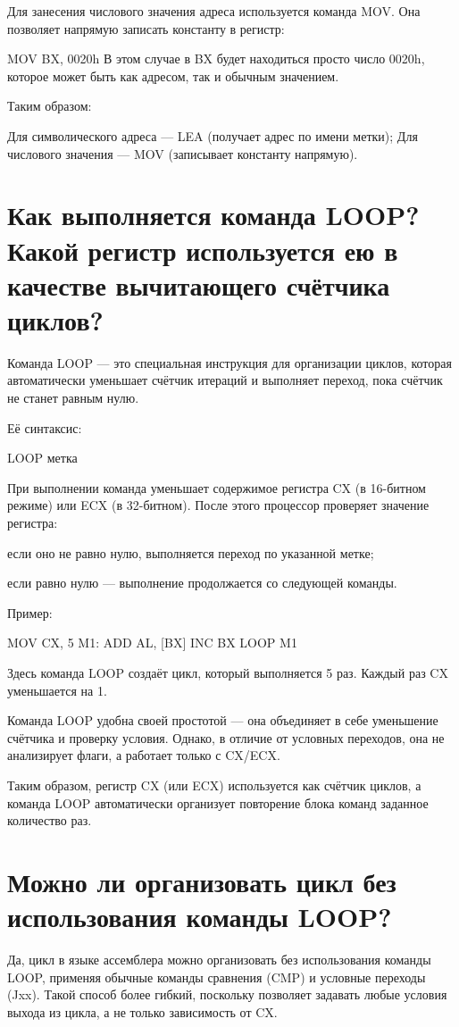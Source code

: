 Для занесения числового значения адреса используется команда MOV. Она позволяет напрямую записать константу в регистр:

MOV BX, 0020h
В этом случае в BX будет находиться просто число 0020h, которое может быть как адресом, так и обычным значением.

Таким образом:

Для символического адреса — LEA (получает адрес по имени метки);
Для числового значения — MOV (записывает константу напрямую).

\section{Как выполняется команда LOOP? Какой регистр используется ею в качестве вычитающего счётчика циклов?}

Команда LOOP — это специальная инструкция для организации циклов, которая автоматически уменьшает счётчик итераций и выполняет переход, пока счётчик не станет равным нулю.

Её синтаксис:

LOOP метка

При выполнении команда уменьшает содержимое регистра CX (в 16-битном режиме) или ECX (в 32-битном). После этого процессор проверяет значение регистра:

если оно не равно нулю, выполняется переход по указанной метке;

если равно нулю — выполнение продолжается со следующей команды.

Пример:

MOV CX, 5
M1:  ADD AL, [BX]
     INC BX
     LOOP M1

Здесь команда LOOP создаёт цикл, который выполняется 5 раз. Каждый раз CX уменьшается на 1.

Команда LOOP удобна своей простотой — она объединяет в себе уменьшение счётчика и проверку условия. Однако, в отличие от условных переходов, она не анализирует флаги, а работает только с CX/ECX.

Таким образом, регистр CX (или ECX) используется как счётчик циклов, а команда LOOP автоматически организует повторение блока команд заданное количество раз.

\section{Можно ли организовать цикл без использования команды LOOP?}

Да, цикл в языке ассемблера можно организовать без использования команды LOOP, применяя обычные команды сравнения (CMP) и условные переходы (Jxx). Такой способ более гибкий, поскольку позволяет задавать любые условия выхода из цикла, а не только зависимость от CX.

